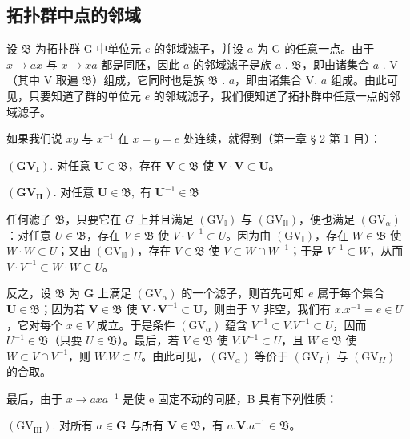 \subsection{拓扑群中点的邻域}

设 \(\mathfrak{B}\) 为拓扑群 G 中单位元 \(e\) 的邻域滤子，并设 \(a\) 为 G 的任意一点。由于 \(x \to ax\) 与 \(x \to xa\) 都是同胚，因此 \(a\) 的邻域滤子是族 \(a\) . \(\mathfrak{B}\)，即由诸集合 \(a\) . V（其中 V 取遍 \(\mathfrak{B}\)）组成，它同时也是族 \(\mathfrak{B}\) . \(a\)，即由诸集合 V. \(a\) 组成。由此可见，只要知道了群的单位元 \(e\) 的邻域滤子，我们便知道了拓扑群中任意一点的邻域滤子。

如果我们说 \(xy\) 与 \(x^{-1}\) 在 \(x = y = e\) 处连续，就得到（第一章 § 2 第 1 目）：

\((\mathbf{GV}_{\mathbf{I}})\). 对任意 \(\mathbf{U} \in \mathfrak{B}\)，存在 \(\mathbf{V} \in \mathfrak{B}\) 使 \(\mathbf{V} \cdot \mathbf{V} \subset \mathbf{U}\)。

\((\mathbf{GV}_{\mathbf{II}})\). 对任意 \(\mathbf{U}\in \mathfrak{B},\) 有 \(\mathbf{U}^{-1}\in \mathfrak{B}\)

任何滤子 \(\mathfrak{B}\)，只要它在 \(G\) 上并且满足 \((\mathrm{GV}_{\mathbb{I}})\) 与 \((\mathrm{GV}_{\mathbb{II}})\)，便也满足 \((\mathrm{GV}_{\alpha})\)：对任意 \(U \in \mathfrak{B}\)，存在 \(V \in \mathfrak{B}\) 使 \(V \cdot V^{-1} \subset U\)。因为由 \((\mathrm{GV}_{\mathbb{I}})\)，存在 \(W \in \mathfrak{B}\) 使 \(W \cdot W \subset U\)；又由 \((\mathrm{GV}_{\mathbb{II}})\)，存在 \(V \in \mathfrak{B}\) 使 \(V \subset W \cap W^{-1}\)；于是 \(V^{-1} \subset W\)，从而 \(V \cdot V^{-1} \subset W \cdot W \subset U\)。

反之，设 \(\mathfrak{B}\) 为 \(\mathbf{G}\) 上满足 \((\mathrm{GV}_{\alpha})\) 的一个滤子，则首先可知 \(e\) 属于每个集合 \(\mathbf{U} \in \mathfrak{B}\)；因为若 \(\mathbf{V} \in \mathfrak{B}\) 使 \(\mathbf{V} \cdot \mathbf{V}^{-1} \subset \mathbf{U}\)，则由于 V 非空，我们有 \(x.x^{-1}=e\in U\)，它对每个 \(x\in V\) 成立。于是条件 \((\mathrm{GV}_{\alpha})\) 蕴含 \(V^{-1}\subset V.V^{-1}\subset U\)，因而 \(U^{-1}\in\mathfrak{B}\)（只要 \(U\in\mathfrak{B}\)）。最后，若 \(V\in\mathfrak{B}\) 使 \(V.V^{-1}\subset U\)，且 \(W\in\mathfrak{B}\) 使 \(W\subset V\cap V^{-1}\)，则 \(W.W\subset U\)。由此可见，\((\mathrm{GV}_{\alpha})\) 等价于 \((\mathrm{GV}_{I})\) 与 \((\mathrm{GV}_{II})\) 的合取。

最后，由于 \(x \rightarrow axa^{-1}\) 是使 e 固定不动的同胚，B 具有下列性质：

\((\mathrm{GV}_{\mathrm{III}})\). 对所有 \(a \in \mathbf{G}\) 与所有 \(\mathbf{V} \in \mathfrak{B}\)，有 \(a. \mathbf{V}.a^{-1} \in \mathfrak{B}\)。

